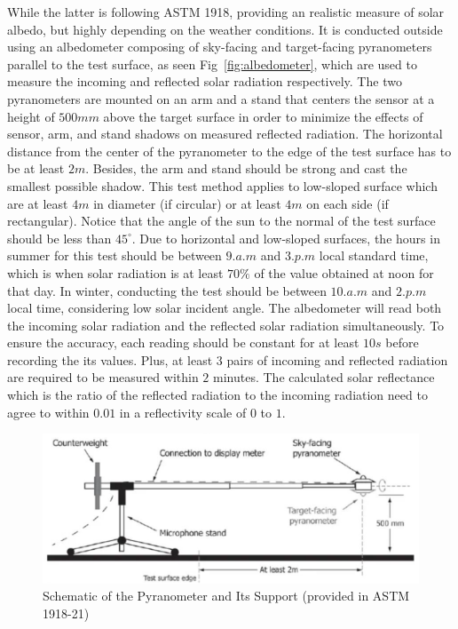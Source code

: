 While the latter is following ASTM 1918, providing an realistic measure of solar albedo, but highly depending on the weather conditions.
It is conducted outside using an albedometer composing of sky-facing and target-facing pyranometers parallel to the test surface, as seen Fig~\ref{fig:albedometer}, which are used to measure the incoming and reflected solar radiation respectively.
The two pyranometers are mounted on an arm and a stand that centers the sensor at a height of $500mm$ above the target surface in order to minimize the effects of sensor, arm, and stand shadows on measured reflected radiation.
The horizontal distance from the center of the pyranometer to the edge of the test surface has to be at least $2m$.
Besides, the arm and stand should be strong and cast the smallest possible shadow.
This test method applies to low-sloped surface which are at least $4m$ in diameter (if circular) or at least $4m$ on each side (if rectangular).
Notice that the angle of the sun to the normal of the test surface should be less than $45^\circ$.
Due to horizontal and low-sloped surfaces, the hours in summer for this test should be between $9.a.m$ and $3.p.m$ local standard time, which is when solar radiation is at least $70\%$ of the value obtained at noon for that day.
In winter, conducting the test should be between $10.a.m$ and $2.p.m$ local time, considering low solar incident angle.
The albedometer will read both the incoming solar radiation and the reflected solar radiation simultaneously.
To ensure the accuracy, each reading should be constant for at least $10s$ before recording the its values.
Plus, at least $3$ pairs of incoming and reflected radiation are required to be measured within $2$ minutes.
The calculated solar reflectance which is the ratio of the reflected radiation to the incoming radiation need to agree to within $0.01$ in a reflectivity scale of $0$ to $1$.

\begin{figure}[!tb]
    \centering
    \includegraphics[width=0.9\linewidth]{./figures/optical-properties-of-road-surface/pyranometer.png}
    \caption{Schematic of the Pyranometer and Its Support (provided in ASTM 1918-21)}
    \label{fig:pyranometer}
\end{figure}

